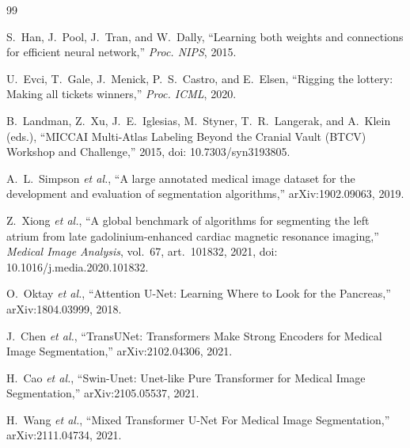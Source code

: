 \documentclass[conference]{IEEEtran}   %
\newcommand{\etal}{\textit{et al.}}
\begin{document}

\begin{thebibliography}{99}



S.~Han, J.~Pool, J.~Tran, and W.~Dally,
``Learning both weights and connections for efficient neural network,''
\textit{Proc. NIPS}, 2015.

U.~Evci, T.~Gale, J.~Menick, P.~S.~Castro, and E.~Elsen,
``Rigging the lottery: Making all tickets winners,''
\textit{Proc. ICML}, 2020.












B.~Landman, Z.~Xu, J.~E.~Iglesias, M.~Styner, T.~R.~Langerak, and A.~Klein (eds.),
``MICCAI Multi-Atlas Labeling Beyond the Cranial Vault (BTCV) Workshop and Challenge,'' 2015, doi: 10.7303/syn3193805.

A.~L.~Simpson \etal,
``A large annotated medical image dataset for the development and evaluation of segmentation algorithms,'' arXiv:1902.09063, 2019.

Z.~Xiong \etal,
``A global benchmark of algorithms for segmenting the left atrium from late gadolinium-enhanced cardiac magnetic resonance imaging,''
\textit{Medical Image Analysis}, vol.~67, art.~101832, 2021, doi: 10.1016/j.media.2020.101832.

O.~Oktay \etal,
``Attention U-Net: Learning Where to Look for the Pancreas,'' arXiv:1804.03999, 2018.

J.~Chen \etal,
``TransUNet: Transformers Make Strong Encoders for Medical Image Segmentation,'' arXiv:2102.04306, 2021.

H.~Cao \etal,
``Swin-Unet: Unet-like Pure Transformer for Medical Image Segmentation,'' arXiv:2105.05537, 2021.

H.~Wang \etal,
``Mixed Transformer U-Net For Medical Image Segmentation,'' arXiv:2111.04734, 2021.


\end{thebibliography}
\end{document}
